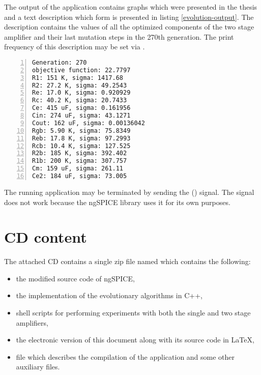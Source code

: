 The output of the application contains graphs which were presented in the thesis and a text description which form is presented in listing \ref{evolution-output}. The description contains the values of all the optimized components of the two stage amplifier and their last mutation steps in the 270th generation. The print frequency of this description may be set via .

\begin{lstlisting}[caption={Evolution text output example},
                   label={evolution-output},
                   captionpos=b,
                   numbers=left]
Generation: 270
objective function: 22.7797
R1: 151 K, sigma: 1417.68
R2: 27.2 K, sigma: 49.2543
Re: 17.0 K, sigma: 0.920929
Rc: 40.2 K, sigma: 20.7433
Ce: 415 uF, sigma: 0.161956
Cin: 274 uF, sigma: 43.1271
Cout: 162 uF, sigma: 0.00136042
Rgb: 5.90 K, sigma: 75.8349
Reb: 17.8 K, sigma: 97.2993
Rcb: 10.4 K, sigma: 127.525
R2b: 185 K, sigma: 392.402
R1b: 200 K, sigma: 307.757
Cm: 159 uF, sigma: 261.11
Ce2: 184 uF, sigma: 73.005
\end{lstlisting}

The running application may be terminated by sending the  () signal. The  signal does not work because the ngSPICE library uses it for its own purposes.

\chapter{CD content}
The attached CD contains a single zip file named  which contains the following:

\begin{itemize}
    \item the modified source code of ngSPICE,
    \item the implementation of the evolutionary algorithms in C++,
    \item shell scripts for performing experiments with both the single and two stage amplifiers,
    \item the electronic version of this document along with its source code in \LaTeX,
    \item file  which describes the compilation of the application and some other auxiliary files.
\end{itemize}


